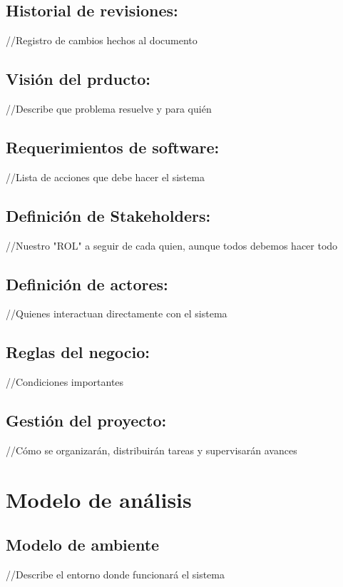 \documentclass[12pt, letterpaper]{article}
\begin{document}
\subsection{Historial de revisiones:}
//Registro de cambios hechos al documento\\

\subsection{Visión del prducto:}
//Describe que problema resuelve y para quién\\ 

\subsection{Requerimientos de software:}
//Lista de acciones que debe hacer el sistema\\

\subsection{Definición de Stakeholders:}
//Nuestro "ROL" a seguir de cada quien, aunque todos debemos hacer todo\\
\subsection{Definición de actores:}
//Quienes interactuan directamente con el sistema\\

\subsection{Reglas del negocio:}
//Condiciones importantes\\

\subsection{Gestión del proyecto:}
//Cómo se organizarán, distribuirán tareas y supervisarán avances\\

\section{\textbf{Modelo de análisis}}
\subsection{Modelo de ambiente}
//Describe el entorno donde funcionará el sistema\\
\end{document}
